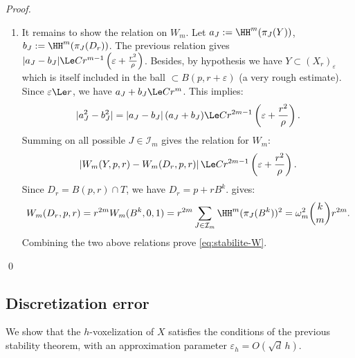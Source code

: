 \begin{proof}
\begin{enumerate}
      \item It remains to show the relation on $W_m$. Let
        $a_J:=\HH^m(\pi_J(Y))$, $b_J:=\HH^m(\pi_J(D_r))$. The previous
        relation gives $|a_J-b_J| \Le C r^{m-1} \left(
        \varepsilon+\frac{r^2}{\rho} \right)$.  Besides, by hypothesis
        we have $Y\subset (X_r)_\varepsilon$ which is itself included
        in the ball $\subset B(p,r+\varepsilon)$ (a very rough
        estimate). Since $\varepsilon\Le r$, we have $a_J+b_J\Le C
        r^m$. This implies:
        \begin{equation*}
          |a_J^2-b_J^2| = |a_J-b_J|\,(a_J+b_J) \Le C r^{2m-1}
          \left( \varepsilon+\frac{r^2}{\rho} \right).
        \end{equation*}
        Summing on all possible $J \in \mathcal{I}_m$ gives the relation for $W_m$:
        \[
        \left| W_m(Y,p,r)-W_m(D_r,p,r)\right| \Le C r^{2m-1} \left( \varepsilon+\frac{r^2}{\rho}\right).
        \]
        Since $D_r=B(p,r) \cap T$, we have $D_r=p +
        rB^k$.  gives:
        \[
        W_m(D_r,p,r) = r^{2m} W_m( B^k,0,1 ) =
        r^{2m} \sum_{J \in \mathcal{I}_m} \HH^m(\pi_J(B^k))^2
        = \omega_m^2\binom{k}{m}r^{2m}.
        \]
        Combining the two above relations prove \eqref{eq:stabilite-W}.
  \end{enumerate}
  \qed
\end{proof}


\subsection{Discretization error}

We show that the $h$-voxelization of $X$ satisfies the conditions of
the previous stability theorem, with an approximation parameter
$\varepsilon_h=O(\sqrt d\,h)$.

